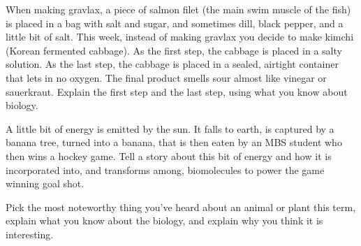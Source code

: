 \documentclass[exam,addpoints,noanswers]{exam}
\begin{document}
\begin{questions}
\clearpage
\question[23] When making gravlax, a piece of salmon filet (the main swim muscle of the fish) is placed in a bag with salt and sugar, and sometimes dill, black pepper, and a little bit of salt. This week, instead of making gravlax you decide to make kimchi (Korean fermented cabbage). As the first step, the cabbage is placed in a salty solution. As the last step, the cabbage is placed in a sealed, airtight container that lets in no oxygen. The final product smells sour almost like vinegar or sauerkraut. Explain the first step and the last step, using what you know about biology. 

\clearpage
\question[22] A little bit of energy is emitted by the sun. It falls to earth, is captured by a banana tree, turned into a banana, that is then eaten by an MBS student who then wins a hockey game. Tell a story about this bit of energy and how it is incorporated into, and transforms among, biomolecules to power the game winning goal shot. 

\clearpage
\question[23] Pick the most noteworthy thing you've heard about an animal or plant this term, explain what you know about the biology, and explain why you think it is interesting. 
\end{questions}
\end{document}
